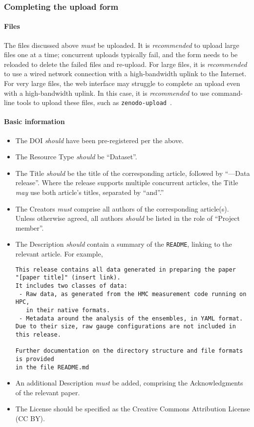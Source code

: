 \documentclass{article}
\newcommand\rfcword[1]{\emph{#1}\xspace}
\newcommand\must{\rfcword{must}}
\newcommand\should{\rfcword{should}}
\newcommand\recommended{\rfcword{recommended}}
\newcommand\may{\rfcword{may}}
\newcommand\filename[1]{\texttt{#1}\xspace}
\newcommand\readme{\filename{README}}
\begin{document}
\subsubsection{Completing the upload form}\label{sec:upload-form}

\paragraph{Files}

The files discussed above \must be uploaded.
It is \recommended to upload large files one at a time;
concurrent uploads typically fail,
and the form needs to be reloaded to delete the failed files and re-upload.
For large files,
it is \recommended to use a wired network connection
with a high-bandwidth uplink to the Internet.
For very large files,
the web interface may struggle to complete an upload even with a high-bandwidth uplink.
In this case,
it is \recommended to use command-line tools to upload these files,
such as \verb|zenodo-upload|~\cite{zenodo-upload}.


\paragraph{Basic information}

\begin{itemize}
  \item
        The DOI \should have been pre-registered per the above.
  \item
        The Resource Type \should be ``Dataset''.
  \item
        The Title \should be the title of the corresponding article,
        followed by ``---Data release''.
        Where the release supports multiple concurrent articles,
        the Title \may use both article's titles,
        separated by ``and''.''
  \item
        The Creators \must comprise all authors of the corresponding article(s).
        Unless otherwise agreed,
        all authors \should be listed in the role of ``Project member''.
  \item
        The Description \should contain a summary of the \readme,
        linking to the relevant article.
        For example,
\begin{verbatim}
This release contains all data generated in preparing the paper
"[paper title]" (insert link).
It includes two classes of data:
 - Raw data, as generated from the HMC measurement code running on HPC,
   in their native formats.
 - Metadata around the analysis of the ensembles, in YAML format.
Due to their size, raw gauge configurations are not included in this release.

Further documentation on the directory structure and file formats is provided
in the file README.md
\end{verbatim}
  \item
        An additional Description \must be added,
        comprising the Acknowledgments of the relevant paper.
  \item
        The License should be specified as the Creative Commons Attribution License
        (CC BY).
\end{itemize}
\end{document}
